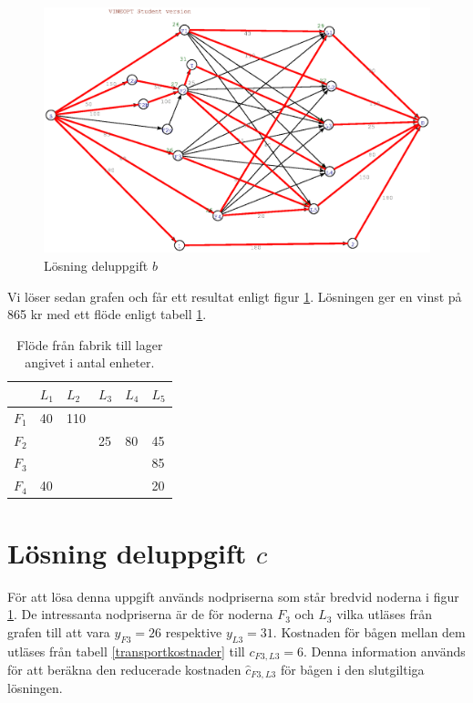 \documentclass[titlepage, a4paper]{article}
\begin{document}
\begin{figure}[h!]
\centerline{\includegraphics[scale=0.65]{laborationsuppgift_13b_solved.ps}}
\caption{Lösning deluppgift $b$} \label{uppgiftb-graf}
\end{figure}

Vi löser sedan grafen och får ett resultat enligt figur \ref{uppgiftb-graf}. Lösningen ger en vinst på 865 kr med ett flöde enligt tabell \ref{uppgiftb-flode}.

\begin{table}[h!]
    \centering
    \begin{tabular}{ | l | l | l | l | l | l | }
        \hline
        {} & {$L_{1}$} & {$L_{2}$} & {$L_{3}$} & {$L_{4}$} & {$L_{5}$} \\\hline
        {$F_{1}$} & {40} & {110} & {} & {} & {} \\\hline
        {$F_{2}$} & {} & {} & {25} & {80} & {45} \\\hline
        {$F_{3}$} & {} & {} & {} & {} & {85} \\\hline
        {$F_{4}$} & {40} & {} & {} & {} & {20} \\\hline
    \end{tabular}
    \caption{Flöde från fabrik till lager angivet i antal enheter.} \label{uppgiftb-flode}
\end{table}

\section{Lösning deluppgift $c$}
För att lösa denna uppgift används nodpriserna som står bredvid noderna i figur \ref{uppgiftb-graf}. De intressanta nodpriserna är de för noderna $F_{3}$ och $L_{3}$ vilka utläses från grafen till att vara $y_{F3} = 26$ respektive $y_{L3} = 31$. Kostnaden för bågen mellan dem utläses från tabell \ref{transportkostnader} till $c_{F3,L3} = 6$. Denna information används för att beräkna den reducerade kostnaden $\hat{c}_{F3,L3}$ för bågen i den slutgiltiga lösningen.
\end{document}
